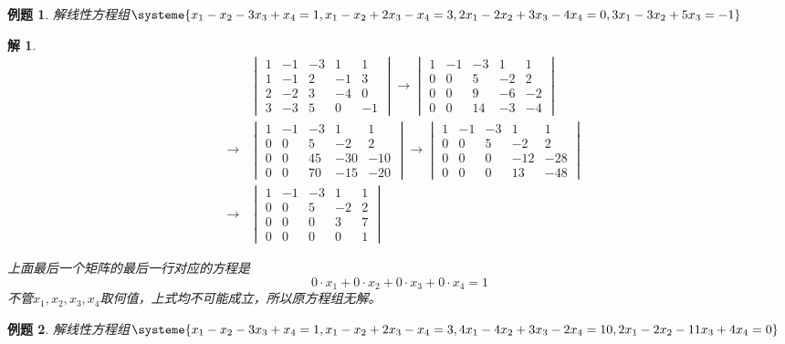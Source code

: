 \documentclass[a4paper]{book}
\newtheorem{eg}{例题}[chapter]
\newtheorem*{solution}{解}
\begin{document}
\begin{eg}
解线性方程组$\systeme{x_1 - x_2 - 3x_3 + x_4 = 1 , x_1 - x_2 + 2x_3 - x_4 = 3 , 2x_1 - 2x_2 + 3x_3 - 4x_4 = 0 , 3x_1 - 3x_2 + 5x_3 = -1 }$
\end{eg}
\begin{solution}
\begin{eqnarray*}
& & \begin{vmatrix} 1 & -1 & -3 & 1 & 1 \\ 1 & -1 & 2 & -1 & 3 \\ 2 & -2 & 3 & -4 & 0 \\ 3 & -3 & 5 & 0 & -1 \end{vmatrix} \longrightarrow \begin{vmatrix} 1 & -1 & -3 & 1 & 1 \\ 0 & 0 & 5 & -2 & 2 \\ 0 & 0 & 9 & -6 & -2 \\ 0 & 0 & 14 & -3 & -4 \end{vmatrix} \\
&\longrightarrow & \begin{vmatrix} 1 & -1 & -3 & 1 & 1 \\ 0 & 0 & 5 & -2 & 2 \\ 0 & 0 & 45 & -30 & -10 \\ 0 & 0 & 70 & -15 & -20 \end{vmatrix}
\longrightarrow \begin{vmatrix} 1 & -1 & -3 & 1 & 1 \\ 0 & 0 & 5 & -2 & 2 \\ 0 & 0 & 0 & -12 & -28 \\ 0 & 0 & 0 & 13 & -48 \end{vmatrix} \\ &\longrightarrow & \begin{vmatrix} 1 & -1 & -3 & 1 & 1 \\ 0 & 0 & 5 & -2 & 2 \\ 0 & 0 & 0 & 3 & 7 \\ 0 & 0 & 0 & 0 & 1 \end{vmatrix}
\end{eqnarray*}

上面最后一个矩阵的最后一行对应的方程是
$$0\cdot x_1 + 0\cdot x_2 + 0\cdot x_3 + 0\cdot x_4 = 1$$
不管$x_1, x_2, x_3, x_4$取何值，上式均不可能成立，所以原方程组无解。
\end{solution}

\vspace{1.5em}

\begin{eg}
解线性方程组$\systeme{x_1 - x_2 - 3x_3 + x_4 = 1 , x_1 - x_2 + 2x_3 - x_4 = 3 , 4x_1 - 4x_2 + 3x_3 - 2x_4 = 10 , 2x_1 - 2x_2 - 11x_3 + 4x_4 = 0}$
\end{eg}
\end{document}

